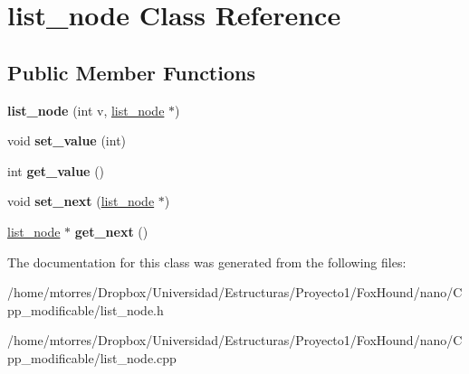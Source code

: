 \hypertarget{classlist__node}{\section{list\-\_\-node Class Reference}
\label{classlist__node}
}
\subsection*{Public Member Functions}
\begin{DoxyCompactItemize}
\item 
\hypertarget{classlist__node_a9b9ef19a716fe4a3e52f5f7b3739caf7}{{\bfseries list\-\_\-node} (int v, \hyperlink{classlist__node}{list\-\_\-node} $\ast$)}\label{classlist__node_a9b9ef19a716fe4a3e52f5f7b3739caf7}

\item 
\hypertarget{classlist__node_a775315187e361ab4dd6a8a3add2ba59c}{void {\bfseries set\-\_\-value} (int)}\label{classlist__node_a775315187e361ab4dd6a8a3add2ba59c}

\item 
\hypertarget{classlist__node_a8248fa0566e951fe9e57e3e110b73f33}{int {\bfseries get\-\_\-value} ()}\label{classlist__node_a8248fa0566e951fe9e57e3e110b73f33}

\item 
\hypertarget{classlist__node_a9808bd1c12f8265d261793b2f60b8b95}{void {\bfseries set\-\_\-next} (\hyperlink{classlist__node}{list\-\_\-node} $\ast$)}\label{classlist__node_a9808bd1c12f8265d261793b2f60b8b95}

\item 
\hypertarget{classlist__node_a8652a8e934c044a5d3e898629173c23f}{\hyperlink{classlist__node}{list\-\_\-node} $\ast$ {\bfseries get\-\_\-next} ()}\label{classlist__node_a8652a8e934c044a5d3e898629173c23f}

\end{DoxyCompactItemize}


The documentation for this class was generated from the following files\-:\begin{DoxyCompactItemize}
\item 
/home/mtorres/\-Dropbox/\-Universidad/\-Estructuras/\-Proyecto1/\-Fox\-Hound/nano/\-Cpp\-\_\-modificable/list\-\_\-node.\-h\item 
/home/mtorres/\-Dropbox/\-Universidad/\-Estructuras/\-Proyecto1/\-Fox\-Hound/nano/\-Cpp\-\_\-modificable/list\-\_\-node.\-cpp\end{DoxyCompactItemize}

